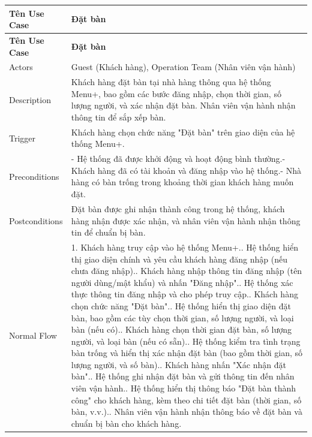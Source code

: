 \begin{itemize}
        \begin{longtable}{|p{3cm}|p{12cm}|}
        \hline
        \textbf{Tên Use Case} & \textbf{Đặt bàn} \\ 
        \hline
        \endfirsthead
        \hline
        \textbf{Tên Use Case} & \textbf{Đặt bàn} \\ 
        \endhead
        \hline
        \endfoot
        \hline
        \endlastfoot
        Actors & Guest (Khách hàng), Operation Team (Nhân viên vận hành) \\ 
        \hline
        Description & Khách hàng đặt bàn tại nhà hàng thông qua hệ thống Menu+, bao gồm các bước đăng nhập, chọn thời gian, số lượng người, và xác nhận đặt bàn. Nhân viên vận hành nhận thông tin để sắp xếp bàn. \\
        \hline
        Trigger & Khách hàng chọn chức năng "Đặt bàn" trên giao diện của hệ thống Menu+. \\
        \hline
        Preconditions & - Hệ thống đã được khởi động và hoạt động bình thường.\newline- Khách hàng đã có tài khoản và đăng nhập vào hệ thống.\newline- Nhà hàng có bàn trống trong khoảng thời gian khách hàng muốn đặt. \\
        \hline
        Postconditions & Đặt bàn được ghi nhận thành công trong hệ thống, khách hàng nhận được xác nhận, và nhân viên vận hành nhận thông tin để chuẩn bị bàn. \\
        \hline
        Normal Flow & 1. Khách hàng truy cập vào hệ thống Menu+.\newline2. Hệ thống hiển thị giao diện chính và yêu cầu khách hàng đăng nhập (nếu chưa đăng nhập).\newline3. Khách hàng nhập thông tin đăng nhập (tên người dùng/mật khẩu) và nhấn "Đăng nhập".\newline4. Hệ thống xác thực thông tin đăng nhập và cho phép truy cập.\newline5. Khách hàng chọn chức năng "Đặt bàn".\newline6. Hệ thống hiển thị giao diện đặt bàn, bao gồm các tùy chọn thời gian, số lượng người, và loại bàn (nếu có).\newline7. Khách hàng chọn thời gian đặt bàn, số lượng người, và loại bàn (nếu có sẵn).\newline8. Hệ thống kiểm tra tình trạng bàn trống và hiển thị xác nhận đặt bàn (bao gồm thời gian, số lượng người, và số bàn).\newline9. Khách hàng nhấn "Xác nhận đặt bàn".\newline10. Hệ thống ghi nhận đặt bàn và gửi thông tin đến nhân viên vận hành.\newline11. Hệ thống hiển thị thông báo "Đặt bàn thành công" cho khách hàng, kèm theo chi tiết đặt bàn (thời gian, số bàn, v.v.).\newline12. Nhân viên vận hành nhận thông báo về đặt bàn và chuẩn bị bàn cho khách hàng. \\

\end{longtable}
\end{itemize}
